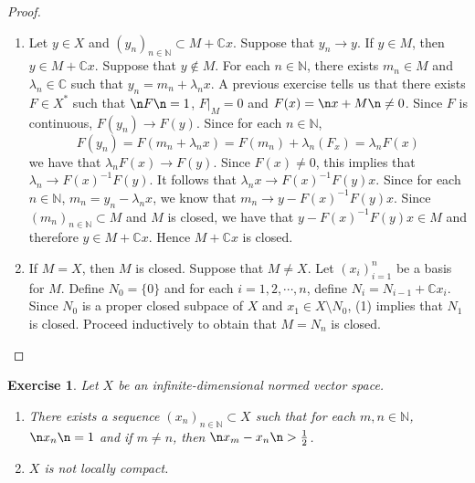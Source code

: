 \documentclass[12pt]{amsart}
\newtheorem{ex}[thm]{Exercise}
\newcommand{\lam}{\lambda}
\newcommand{\C}{\mathbb{C}}
\newcommand{\N}{\mathbb{N}}
\newcommand{\conv}[1]{\xrightarrow{#1}}
\begin{document}
\begin{proof}
	\begin{enumerate}
		\item Let $y \in X$ and $(y_n)_{n \in \N} \subset M+ \C x$. Suppose that $y_n \conv{} y$. If $y \in M$, then $y \in M+ \C x$. Suppose that $y \not \in M$. For each $n \in \N$, there exists $m_n \in M$ and $\lam_n \in \C$ such that $y_n = m_n + \lam_nx$. A previous exercise tells us that there exists $F \in X^*$ such that $\n F \n = 1$, $F|_M = 0$ and $F(x) = \n x+M \n \neq 0$. Since $F$ is continuous, $F(y_n) \conv{} F(y)$. Since for each $n \in \N$, $$F(y_n) = F(m_n + \lam_n x) = F(m_n)+ \lam_n (F_x) = \lam_n F(x)$$ we have that $\lam_n F(x) \conv{} F(y)$. Since $F(x) \neq 0$, this implies that $\lam_n \conv{} F(x)^{-1} F(y)$. It follows that $\lam_n x \conv{}F(x)^{-1}F(y)x$. Since  for each $n \in \N$, $m_n = y_n - \lam_nx$, we know that $m_n \conv{} y-F(x)^{-1}F(y)x$. Since $(m_n)_{n \in \N} \subset M$ and $M$ is closed, we have that $y-F(x)^{-1}F(y)x \in M$ and therefore $y \in M+\C x$. Hence $M+\C x$ is closed. \vspace{.5cm}\\
		\item If $M = X$, then $M$ is closed. Suppose that $M \neq X$. Let $(x_i)_{i=1}^n$ be a basis for $M$. Define $N_0 = \{0\}$ and for each $i =1,2, \cdots, n$, define $N_i = N_{i-1}+\C x_i$. Since $N_0$ is a proper closed subpace of $X$ and $x_1 \in X \setminus N_0$, (1) implies that $N_1$ is closed. Proceed inductively to obtain that $M = N_n$ is closed.
	\end{enumerate}
\end{proof}

\begin{ex}
	Let $X$ be an infinite-dimensional normed vector space. 
	\begin{enumerate}
		\item There exists a sequence $(x_n)_{n\in \N} \subset X$ such that for each $m, n \in \N$, $\n x_n \n = 1$ and if $m \neq n$, then $\n x_m - x_n \n > \frac{1}{2}$.
		\item $X$ is not locally compact. 
	\end{enumerate}
\end{ex}
\end{document}
